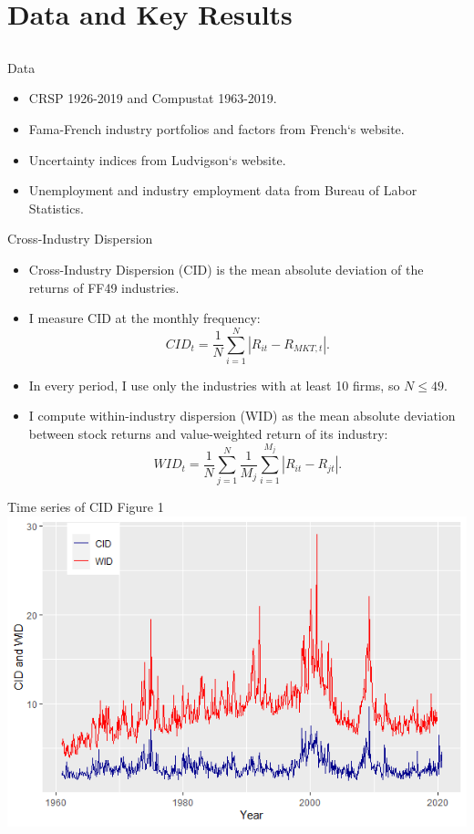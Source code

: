 \documentclass{beamer}
\begin{document}
\section{Data and Key Results}
\subsection{}


\begin{frame}{Data}
\begin{itemize}
    \item {CRSP 1926-2019 and Compustat 1963-2019.}
    \item {Fama-French industry portfolios and factors from French`s website.}
    \item {Uncertainty indices from Ludvigson`s website.}
    \item {Unemployment and industry employment data from Bureau of Labor Statistics.}
\end{itemize}
\end{frame}



\begin{frame}{Cross-Industry Dispersion}
\begin{itemize}
    \item {Cross-Industry Dispersion (CID) is the mean absolute deviation of the returns of FF49 industries.}
    \item {I measure CID at the monthly frequency: \\
    $$CID_t = \frac{1}{N}\sum^{N}_{i=1}{|R_{it}-R_{MKT,t}|}.$$}
    \item {In every period, I use only the industries with at least 10 firms, so $N \leq 49$.}
    \item {I compute within-industry dispersion (WID) as the mean absolute deviation between stock returns and value-weighted return of its industry:
    $$WID_t = \frac{1}{N}\sum^{N}_{j=1}\frac{1}{M_j}\sum^{M_j}_{i=1}{|R_{it}-R_{jt}|}.$$}
\end{itemize}
\end{frame}



\begin{frame}{Time series of CID}
{Figure 1}
\includegraphics[width=1\textwidth]{paper_nov20/cid_wid_w.png}
\end{frame}
\end{document}
